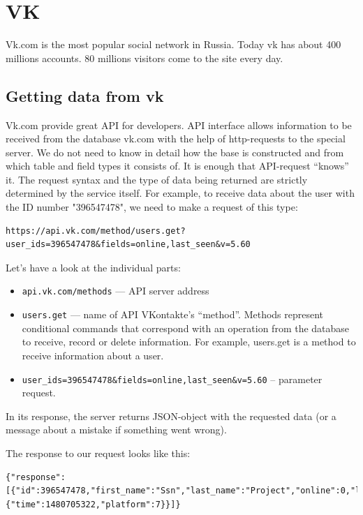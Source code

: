 \section{VK}
Vk.com is the most popular social network in Russia. Today vk has about 400 millions accounts. 80 millions visitors come to the site every day. 
\subsection{Getting data from vk}
Vk.com provide great API for developers. API interface allows information to be received from the database vk.com with the help of http-requests to the special server. We do not need to know in detail how the base is constructed and from which table and field types it consists of. It is enough that API-request “knows” it. The request syntax and the type of data being returned are strictly determined by the service itself. 
For example, to receive data about the user with the ID number "396547478", we need to make a request of this type:


\begin{lstlisting}
https://api.vk.com/method/users.get?user_ids=396547478&fields=online,last_seen&v=5.60
\end{lstlisting}

Let’s have a look at the individual parts:
\begin{itemize}
	\item{\texttt{api.vk.com/methods} — API server address}
	\item{\texttt{users.get} — name of API VKontakte’s “method”. Methods represent conditional commands that correspond with an operation from the database to receive, record or delete information. For example, users.get is a method to receive information about a user.}
	\item{\texttt{user{\_}ids=396547478{\&}fields=online,last{\_}seen{\&}v=5.60}  – parameter request.}
\end{itemize}
	
In its response, the server returns JSON-object with the requested data (or a message about a mistake if something went wrong). 

The response to our request looks like this:
\begin{lstlisting}
{"response":[{"id":396547478,"first_name":"Ssn","last_name":"Project","online":0,"last_seen":{"time":1480705322,"platform":7}}]}
\end{lstlisting}

